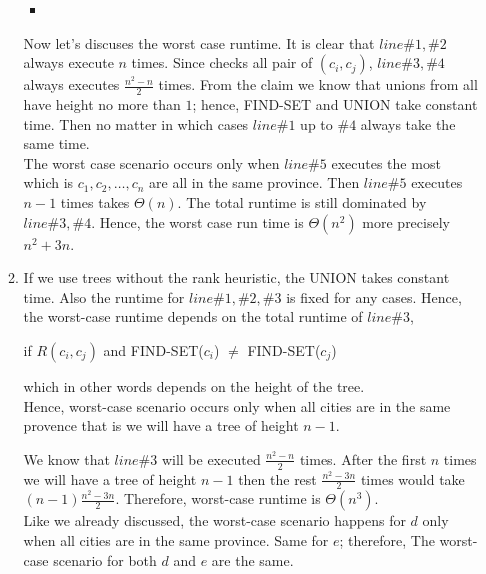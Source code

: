 \documentclass[11pt,twoside]{article}
\begin{document}
\begin{enumerate}[leftmargin=0pt]
\begin{enumerate}
\begin{itemize}[label = {}]
	 \item
	 \end{itemize}
	Now let's discuses the worst case runtime. It is clear that $line \# 1, \#2$ always execute $n$ times. Since   checks all pair of $(c_i,c_j)$, $line \#3, \#4$ always executes $\frac{n^2-n}{2}$ times. 
	From the claim we know that unions from  all have height no more than $1$; hence, FIND-SET and  UNION take constant time. Then no matter in which cases $line \# 1$ up to $\#4$ always take the same time. \\ 
	The worst case scenario occurs only when $line \#5$ executes the most which is  $c_1, c_2, \dots, c_n$ are all in the same province.   Then $line \#5$ executes $n-1$ times takes $\Theta(n)$. The total runtime is still dominated by $line \#3, \#4$. Hence, the worst case run time is $\Theta (n^2)$ more precisely $ n^2+3n $.
\item	 
If we use trees without the rank heuristic, the UNION takes constant time. Also the runtime for $line \# 1, \#2, \#3$ is fixed for any cases. Hence, the worst-case runtime depends on the total runtime of $line \# 3$,  			
	\begin{center} if $R(c_i, c_j)$ and FIND-SET($c_i$)  $\neq$ FIND-SET($c_j$) \end{center}
which in other words depends on the height of the tree.\\

Hence, worst-case scenario occurs only when all cities are in the same provence that is we will have a tree of height $n-1$.

We know that $line \# 3$ will be executed $\frac{n^2-n}{2}$ times. After the first $n$ times we will have a tree of height $n-1$ then the rest $\frac{n^2-3n}{2}$ times would take $(n-1)\frac{n^2-3n}{2}$. Therefore,
worst-case runtime is $\Theta(n^3)$.\\
Like we already discussed, the worst-case scenario happens for $d$ only when all cities are in the same province. Same for $e$; therefore, The worst-case scenario for both $d$ and $e$ are the same.
\end{enumerate}

\end{enumerate}
\end{document}

